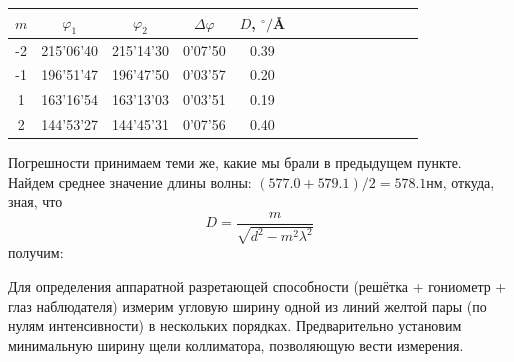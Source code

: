 \documentclass[14pt]{article}
\begin{document}
\begin{center}
\begin{tabular}{|c|c|c|c|c|c|c|c|c|c|c|c|c|c|}
\hline
$m$	&	$\varphi_1$	&	$\varphi_2$	&	$\Delta\varphi$	&	$D$, $^\circ/$\r{A}\\
\hline
-2	&	215'06'40	&	215'14'30	&	0'07'50			&	0.39				\\
\hline
-1	&	196'51'47	&	196'47'50	&	0'03'57			&	0.20				\\
\hline
1	&	163'16'54	&	163'13'03	&	0'03'51			&	0.19				\\
\hline
2	&	144'53'27	&	144'45'31	&	0'07'56			&	0.40				\\
\hline
\end{tabular}
\end{center}

Погрешности принимаем теми же, какие мы брали в предыдущем пункте. Найдем среднее значение длины волны: $(577.0+579.1)/2 = 578.1$нм, откуда, зная, что 
$$
	D = \frac{m}{\sqrt{d^2 - m^2\lambda^2}}
$$
получим:

\begin{flushleft}
\end{flushleft}


Для определения аппаратной разретающей способности (решётка + гониометр + глаз наблюдателя) измерим угловую ширину одной из линий желтой пары (по нулям интенсивности) в нескольких порядках. Предварительно установим минимальную ширину щели коллиматора, позволяющую вести измерения.
\end{document}
